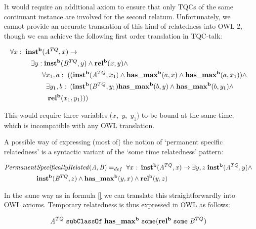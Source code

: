It would require an additional axiom to ensure that only TQCs of the same continuant instance are involved
for the second relatum. Unfortunately, we cannot provide an
accurate translation of this kind of relatedness into OWL 2, though we can
achieve the following first order translation in TQC-talk:


 \begin{equation}
\begin{split}
\forall x:\; \mathrm{\mathbf{inst^b}}&(\mathit{A}^{TQ},x) \rightarrow \\
 \exists y:&\;\mathrm{\mathbf{inst^b}}(\mathit{B}^{TQ},y) \wedge \mathrm{\mathbf{rel^b}}(x,y)\wedge\\
 & \forall x_1,a:\; ((\mathrm{\mathbf{inst^b}}(\mathit{A}^{TQ},x_1) \wedge
\mathrm{\mathbf{has\_max^b}}(a,x) \wedge \mathrm{\mathbf{has\_max^b}}(a,x_1))\wedge\\
&\;\;\exists y_1,b:\;(\mathrm{\mathbf{inst^b}}(\mathit{B}^{TQ},y_1) \mathrm{\mathbf{has\_max^b}}(b,y)  
\wedge \mathrm{\mathbf{has\_max^b}}(b,y_1) \wedge\\&\;\;\;\mathrm{\mathbf{rel^b}}(x_1,y_1)))
\end{split}
\end{equation}

This would require three variables ($x$,~$y$,~$y_1$) to be bound at the same
time, which is incompatible with any OWL translation.



A possible way of expressing (most of) the notion of `permanent specific 
relatedness' is a syntactic variant of the `some time relatedness' pattern:
 
\begin{equation}
\begin{split}
\mathit{Permanent}&\mathit{SpecificallyRelated}(\mathit{A},\mathit{B}) =_{def}\;
\forall x:\; \mathrm{\mathbf{inst^b}}(\mathit{A}^{TQ}, x)
 \rightarrow
\exists y,z \; \mathrm{\mathbf{inst^b}}(\mathit{A}^{TQ},y) \wedge \\ & \mathrm{\mathbf{inst^b}}(\mathit{B}^{TQ},z)
 \wedge \mathrm{\mathbf{has\_max^b}}(y,x) \wedge \mathrm{\mathbf{rel^b}}(y,z)
\end{split}
\label{eq:usesPermSpec}
\end{equation}
 

In the same way as in formula \ref{} we can translate this straightforwardly into OWL
axioms. Temporary relatedness is thus expressed in OWL as follows:

\begin{equation}
\mathit{A}^{TQ}\;\mathtt{subClassOf}\;\mathrm{\mathbf{has\_max^b}}\;\mathtt{some
(}\mathrm{\mathbf{rel^b}}\;\mathtt{some}\;\mathit{B}^{TQ})
\label{eq:tqc:temp2}
\end{equation}






